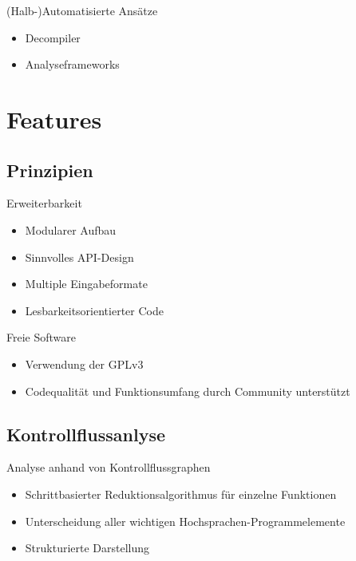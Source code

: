 \documentclass{beamer}
\begin{document}
\begin{frame}{(Halb-)Automatisierte Ansätze}
  \begin{itemize}
  \item Decompiler
  \item Analyseframeworks
  \end{itemize}
\end{frame}

\section{Features}

\subsection{Prinzipien}

\begin{frame}{Erweiterbarkeit}
  \begin{itemize}
  \item Modularer Aufbau
  \item Sinnvolles API-Design
  \item Multiple Eingabeformate
  \item Lesbarkeitsorientierter Code
  \end{itemize}
\end{frame}

\begin{frame}{Freie Software}
  \begin{itemize}
  \item Verwendung der GPLv3
  \item Codequalität und Funktionsumfang durch Community unterstützt
  \end{itemize}
\end{frame}

\subsection{Kontrollflussanlyse}

\begin{frame}{Analyse anhand von Kontrollflussgraphen}
  \begin{itemize}
  \item Schrittbasierter Reduktionsalgorithmus für einzelne Funktionen
  \item Unterscheidung aller wichtigen Hochsprachen-Programmelemente
  \item Strukturierte Darstellung
  \end{itemize}
\end{frame}
\end{document}
